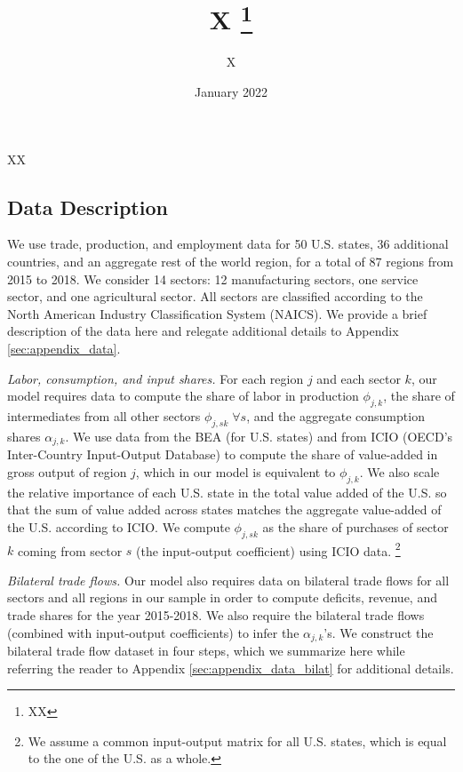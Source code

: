 \documentclass[12pt]{article}
\title{{X}%
\thanks{XX}}
\author{X}
\date{\vspace*{0.5cm} January 2022}
\begin{document}
\maketitle

\thispagestyle{empty}

\begin{small}
\begin{spacing}{1.4}
\noindent

\noindent
XX
\end{spacing}
\end{small}

\newpage


\subsection{Data Description}\label{sec:data}

We use trade, production, and employment data for 50 U.S. states, 36 additional countries, and an aggregate rest of the world region, for a total of 87 regions from 2015 to 2018. We consider 14 sectors: 12 manufacturing sectors, one service sector, and one agricultural sector. All sectors are classified according to the North American Industry Classification System (NAICS). We provide a brief description of the data here and relegate additional details to Appendix \ref{sec:appendix_data}. 

{\textit{Labor, consumption, and input shares.}} For each region $j$ and each sector $k$, our model requires data to compute the share of labor in production $\phi_{j,k}$, the share of intermediates from all other sectors $\phi_{j,sk}\; \forall s$, and the aggregate consumption shares $\alpha_{j,k}$. We use data from the BEA (for U.S. states) and from ICIO (OECD’s Inter-Country Input-Output Database) to compute the share of value-added in gross output of region $j$, which in our model is equivalent to $\phi_{j,k}$. 
We also scale the relative importance of each U.S. state in the total value added of the U.S. so that the sum of value added across states matches the aggregate value-added of the U.S. according to ICIO. We compute $\phi_{j,sk}$ as the share of purchases of sector $k$ coming from sector $s$ (the input-output coefficient) using ICIO data.%
\footnote{We assume a common input-output matrix for all U.S. states, which is equal to the one of the U.S. as a whole.}  

{\textit{Bilateral trade flows.}} Our model also requires data on bilateral trade flows for all sectors and all regions in our sample in order to compute deficits, revenue, and trade shares for the year 2015-2018. We also require the bilateral trade flows (combined with input-output coefficients) to infer the $\alpha_{j,k}$'s. We construct the bilateral trade flow dataset in four steps, which we summarize here while referring the reader to Appendix \ref{sec:appendix_data_bilat} for additional details. 
\end{document}
